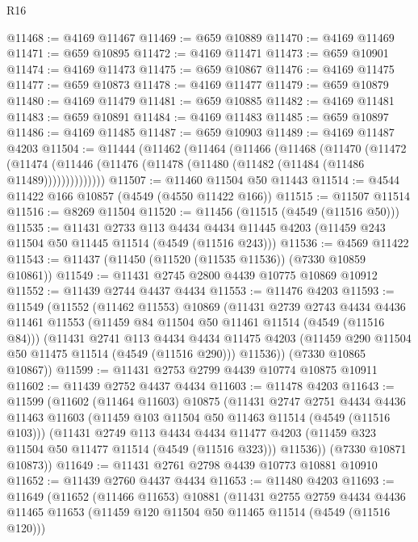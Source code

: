 \begin{lexlean}{R16}
\begin{coremodule}
@11468 := @4169 @11467
@11469 := @659 @10889
@11470 := @4169 @11469
@11471 := @659 @10895
@11472 := @4169 @11471
@11473 := @659 @10901
@11474 := @4169 @11473
@11475 := @659 @10867
@11476 := @4169 @11475
@11477 := @659 @10873
@11478 := @4169 @11477
@11479 := @659 @10879
@11480 := @4169 @11479
@11481 := @659 @10885
@11482 := @4169 @11481
@11483 := @659 @10891
@11484 := @4169 @11483
@11485 := @659 @10897
@11486 := @4169 @11485
@11487 := @659 @10903
@11489 := @4169 @11487 @4203
@11504 := @11444
    (@11462
      (@11464
        (@11466
          (@11468
            (@11470
              (@11472
                (@11474 (@11446 (@11476 (@11478 (@11480 (@11482 (@11484 (@11486 @11489))))))))))))))
@11507 := @11460 @11504 @50 @11443
@11514 := @4544 @11422 @166 @10857 (@4549 (@4550 @11422 @166))
@11515 := @11507 @11514
@11516 := @8269 @11504
@11520 := @11456 (@11515 (@4549 (@11516 @50)))
@11535 := @11431
    @2733
    @113
    @4434
    @4434
    @11445
    @4203
    (@11459 @243 @11504 @50 @11445 @11514 (@4549 (@11516 @243)))
@11536 := @4569 @11422
@11543 := @11437 (@11450 (@11520 (@11535 @11536)) (@7330 @10859 @10861))
@11549 := @11431 @2745 @2800 @4439 @10775 @10869 @10912
@11552 := @11439 @2744 @4437 @4434
@11553 := @11476 @4203
@11593 := @11549
    (@11552
      (@11462 @11553)
      @10869
      (@11431
        @2739
        @2743
        @4434
        @4436
        @11461
        @11553
        (@11459 @84 @11504 @50 @11461 @11514 (@4549 (@11516 @84)))
        (@11431
          @2741
          @113
          @4434
          @4434
          @11475
          @4203
          (@11459 @290 @11504 @50 @11475 @11514 (@4549 (@11516 @290)))
          @11536))
      (@7330 @10865 @10867))
@11599 := @11431 @2753 @2799 @4439 @10774 @10875 @10911
@11602 := @11439 @2752 @4437 @4434
@11603 := @11478 @4203
@11643 := @11599
    (@11602
      (@11464 @11603)
      @10875
      (@11431
        @2747
        @2751
        @4434
        @4436
        @11463
        @11603
        (@11459 @103 @11504 @50 @11463 @11514 (@4549 (@11516 @103)))
        (@11431
          @2749
          @113
          @4434
          @4434
          @11477
          @4203
          (@11459 @323 @11504 @50 @11477 @11514 (@4549 (@11516 @323)))
          @11536))
      (@7330 @10871 @10873))
@11649 := @11431 @2761 @2798 @4439 @10773 @10881 @10910
@11652 := @11439 @2760 @4437 @4434
@11653 := @11480 @4203
@11693 := @11649
    (@11652
      (@11466 @11653)
      @10881
      (@11431
        @2755
        @2759
        @4434
        @4436
        @11465
        @11653
        (@11459 @120 @11504 @50 @11465 @11514 (@4549 (@11516 @120)))

\end{coremodule}
\end{lexlean}
